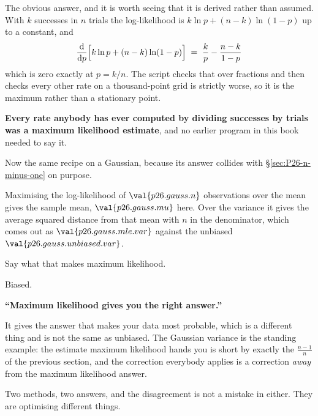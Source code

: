 \begin{fr}

The obvious answer, and it is worth seeing that it is derived rather than
assumed. With $k$ successes in $n$ trials the log-likelihood is
$k\ln p + (n-k)\ln(1-p)$ up to a constant, and
\[ \frac{\mathrm{d}}{\mathrm{d}p}
   \Bigl[k\ln p + (n-k)\ln(1-p)\Bigr]
   \;=\; \frac{k}{p} - \frac{n-k}{1-p} \]
which is zero exactly at $p = k/n$. The script checks that over fractions and
then checks every other rate on a thousand-point grid is strictly worse, so
it is the maximum rather than a stationary point.

\textbf{Every rate anybody has ever computed by dividing successes by trials
was a maximum likelihood estimate}, and no earlier program in this book
needed to say it.
\end{fr}

\begin{fr}
Now the same recipe on a Gaussian, because its answer collides with
\S\ref{sec:P26-n-minus-one} on purpose.

Maximising the log-likelihood of $\val{p26.gauss.n}$ observations over the
mean gives the sample mean, $\val{p26.gauss.mu}$ here. Over the variance it
gives the average squared distance from that mean \dash{} with $n$ in the
denominator, which comes out as $\val{p26.gauss.mle.var}$ against the
unbiased $\val{p26.gauss.unbiased.var}$.

Say what that makes maximum likelihood.
\dotline
\nextframe
\end{fr}

\begin{fr}
\begin{ansblock}
Biased.
\end{ansblock}

\begin{trapbox}
\textbf{\enquote{Maximum likelihood gives you the right answer.}}

It gives the answer that makes your data most probable, which is a different
thing and is not the same as unbiased. The Gaussian variance is the standing
example: the estimate maximum likelihood hands you is short by exactly the
$\frac{n-1}{n}$ of the previous section, and the correction everybody applies
is a correction \emph{away} from the maximum likelihood answer.

Two methods, two answers, and the disagreement is not a mistake in either.
They are optimising different things.
\end{trapbox}
\end{fr}

